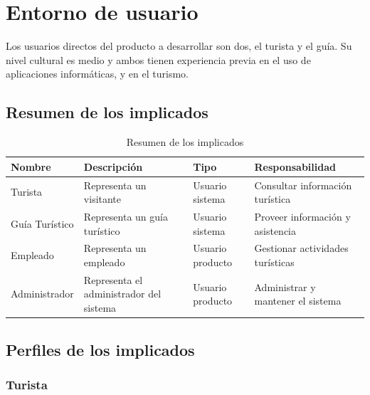 

\chapter{Entorno de usuario}

Los usuarios directos del producto a desarrollar son dos, el turista y el guía. Su nivel cultural es medio y ambos tienen experiencia previa en el uso de aplicaciones informáticas, y en el turismo.

\section*{Resumen de los implicados}

\begin{table}[H]
\centering
\begin{tabular}{|p{3cm}|p{3cm}|p{4cm}|p{4cm}|}
\hline
\rowcolor[HTML]{CFE2F3} 
\textbf{Nombre} & \textbf{Descripción} & \textbf{Tipo} & \textbf{Responsabilidad} \\ \hline
Turista & Representa un visitante & Usuario sistema & Consultar información turística \\ \hline
Guía Turístico & Representa un guía turístico & Usuario sistema & Proveer información y asistencia \\ \hline
Empleado & Representa un empleado & Usuario producto & Gestionar actividades turísticas \\ \hline
Administrador & Representa el administrador del sistema & Usuario producto & Administrar y mantener el sistema \\ \hline
\end{tabular}
\caption{Resumen de los implicados}
\label{tab:resumen_implicados}
\end{table}

\section*{Perfiles de los implicados}

\subsection*{Turista}

